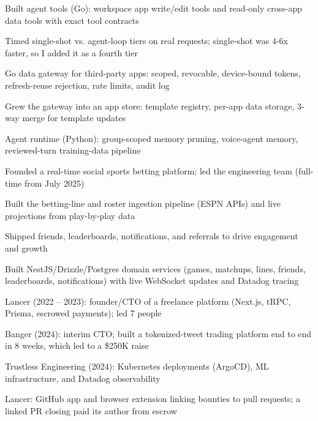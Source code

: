 \documentclass[print]{jack-resume}
\begin{document}
\begin{tightemize}
    \item Built agent tools (Go): workspace app write/edit tools and read-only cross-app data tools with exact tool contracts
    \item Timed single-shot vs. agent-loop tiers on real requests; single-shot was 4-6x faster, so I added it as a fourth tier
    \item Go data gateway for third-party apps: scoped, revocable, device-bound tokens, refresh-reuse rejection, rate limits, audit log
    \item Grew the gateway into an app store: template registry, per-app data storage, 3-way merge for template updates
    \item Agent runtime (Python): group-scoped memory pruning, voice-agent memory, reviewed-turn training-data pipeline
\end{tightemize}
\sectionsep

\begin{tightemize}
    \item Founded a real-time social sports betting platform; led the engineering team (full-time from July 2025)
    \item Built the betting-line and roster ingestion pipeline (ESPN APIs) and live projections from play-by-play data
    \item Shipped friends, leaderboards, notifications, and referrals to drive engagement and growth
    \item Built NestJS/Drizzle/Postgres domain services (games, matchups, lines, friends, leaderboards, notifications) with live WebSocket updates and Datadog tracing
\end{tightemize}
\sectionsep

\begin{tightemize}
    \item Lancer (2022 -- 2023): founder/CTO of a freelance platform (Next.js, tRPC, Prisma, escrowed payments); led 7 people
    \item Banger (2024): interim CTO; built a tokenized-tweet trading platform end to end in 8 weeks, which led to a \$250K raise
    \item Trustless Engineering (2024): Kubernetes deployments (ArgoCD), ML infrastructure, and Datadog observability
    \item Lancer: GitHub app and browser extension linking bounties to pull requests; a linked PR closing paid its author from escrow
\end{tightemize}
\sectionsep
\end{document}
